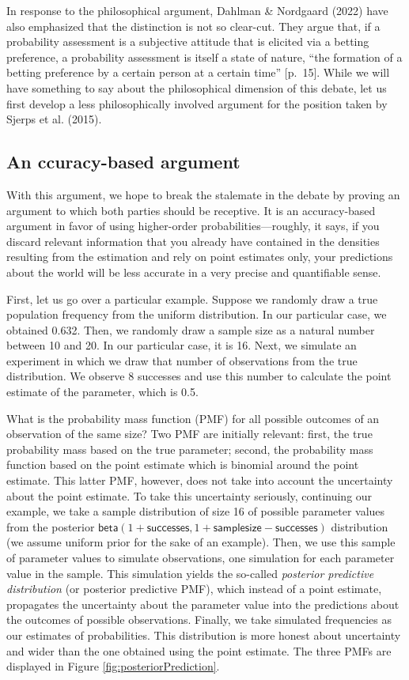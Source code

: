\documentclass[
  10pt,
  dvipsnames,enabledeprecatedfontcommands]{scrartcl}
\newcommand{\s}[1]{\mbox{$\mathsf{#1}$}}
\begin{document}
In response to the philosophical argument, Dahlman \& Nordgaard (2022)
have also emphasized that the distinction is not so clear-cut. They
argue that, if a probability assessment is a subjective attitude that is
elicited via a betting preference, a probability assessment is itself a
state of nature, ``the formation of a betting preference by a certain
person at a certain time'' {[}p.~15{]}. While we will have something to
say about the philosophical dimension of this debate, let us first
develop a less philosophically involved argument for the position taken
by Sjerps et al. (2015).

\hypertarget{an-ccuracy-based-argument}{%
\subsection{An ccuracy-based argument}\label{an-ccuracy-based-argument}}

With this argument, we hope to break the stalemate in the debate by
proving an argument to which both parties should be receptive. It is an
accuracy-based argument in favor of using higher-order
probabilities---roughly, it says, if you discard relevant information
that you already have contained in the densities resulting from the
estimation and rely on point estimates only, your predictions about the
world will be less accurate in a very precise and quantifiable sense.

First, let us go over a particular example. Suppose we randomly draw a
true population frequency from the uniform distribution. In our
particular case, we obtained 0.632. Then, we randomly draw a sample size
as a natural number between 10 and 20. In our particular case, it is 16.
Next, we simulate an experiment in which we draw that number of
observations from the true distribution. We observe 8 successes and use
this number to calculate the point estimate of the parameter, which is
0.5.

What is the probability mass function (PMF) for all possible outcomes of
an observation of the same size? Two PMF are initially relevant: first,
the true probability mass based on the true parameter; second, the
probability mass function based on the point estimate which is binomial
around the point estimate. This latter PMF, however, does not take into
account the uncertainty about the point estimate. To take this
uncertainty seriously, continuing our example, we take a sample
distribution of size 16 of possible parameter values from the posterior
\(\s{beta}(1+\s{successes}, 1+\s{sample size} - \s{successes})\)
distribution (we assume uniform prior for the sake of an example). Then,
we use this sample of parameter values to simulate observations, one
simulation for each parameter value in the sample. This simulation
yields the so-called \emph{posterior predictive distribution} (or
posterior predictive PMF), which instead of a point estimate, propagates
the uncertainty about the parameter value into the predictions about the
outcomes of possible observations. Finally, we take simulated
frequencies as our estimates of probabilities. This distribution is more
honest about uncertainty and wider than the one obtained using the point
estimate. The three PMFs are displayed in Figure
\ref{fig:posteriorPrediction}.
\end{document}
